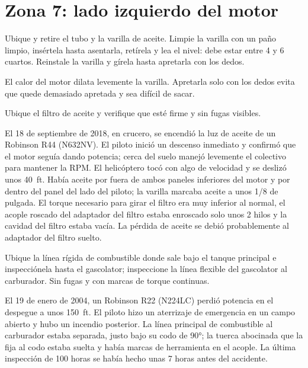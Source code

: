 \section{Zona 7: lado izquierdo del motor}

Ubique y retire el tubo y la varilla de aceite. Limpie la varilla con un paño limpio, insértela hasta asentarla, retírela y lea el nivel: debe estar entre 4 y 6 cuartos. Reinstale la varilla y gírela hasta apretarla con los dedos.

\begin{nota}
El calor del motor dilata levemente la varilla. Apretarla solo con los dedos evita que quede demasiado apretada y sea difícil de sacar.
\end{nota}

Ubique el filtro de aceite y verifique que esté firme y sin fugas visibles.

\begin{caso}
El 18 de septiembre de 2018, en crucero, se encendió la luz de aceite de un Robinson R44 (N632NV). El piloto inició un descenso inmediato y confirmó que el motor seguía dando potencia; cerca del suelo manejó levemente el colectivo para mantener la RPM. El helicóptero tocó con algo de velocidad y se deslizó unos 40~ft. Había aceite por fuera de ambos paneles inferiores del motor y por dentro del panel del lado del piloto; la varilla marcaba aceite a unos 1/8 de pulgada. El torque necesario para girar el filtro era muy inferior al normal, el acople roscado del adaptador del filtro estaba enroscado solo unos 2 hilos y la cavidad del filtro estaba vacía. La pérdida de aceite se debió probablemente al adaptador del filtro suelto.
\end{caso}

Ubique la línea rígida de combustible donde sale bajo el tanque principal e inspecciónela hasta el gascolator; inspeccione la línea flexible del gascolator al carburador. Sin fugas y con marcas de torque continuas.

\begin{caso}
El 19 de enero de 2004, un Robinson R22 (N224LC) perdió potencia en el despegue a unos 150~ft. El piloto hizo un aterrizaje de emergencia en un campo abierto y hubo un incendio posterior. La línea principal de combustible al carburador estaba separada, justo bajo su codo de 90°; la tuerca abocinada que la fija al codo estaba suelta y había marcas de herramienta en el acople. La última inspección de 100 horas se había hecho unas 7 horas antes del accidente.
\end{caso}


